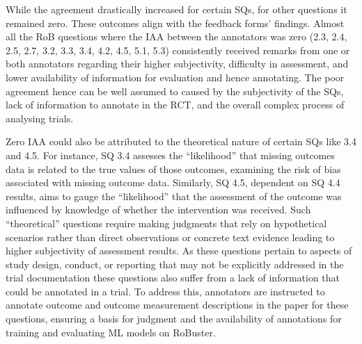 \documentclass[sn-mathphys,Numbered]{sn-jnl}%
\theoremstyle{thmstyleone}%
\theoremstyle{thmstyletwo}%
\theoremstyle{thmstylethree}%
\begin{document}
While the agreement drastically increased for certain SQs, for other questions it remained zero.
These outcomes align with the feedback forms' findings.
Almost all the RoB questions where the IAA between the annotators was zero (2.3, 2.4, 2.5, 2.7, 3.2, 3.3, 3.4, 4.2, 4.5, 5.1, 5.3) consistently received remarks from one or both annotators regarding their higher subjectivity, difficulty in assessment, and lower availability of information for evaluation and hence annotating.
The poor agreement hence can be well assumed to caused by the subjectivity of the SQs, lack of information to annotate in the RCT, and the overall complex process of analysing trials.


Zero IAA could also be attributed to the theoretical nature of certain SQs like 3.4 and 4.5.
For instance, SQ 3.4 assesses the ``likelihood'' that missing outcomes data is related to the true values of those outcomes, examining the risk of bias associated with missing outcome data.
Similarly, SQ 4.5, dependent on SQ 4.4 results, aims to gauge the ``likelihood'' that the assessment of the outcome was influenced by knowledge of whether the intervention was received. 
Such ``theoretical'' questions require making judgments that rely on hypothetical scenarios rather than direct observations or concrete text evidence leading to higher subjectivity of assessment results.
As these questions pertain to aspects of study design, conduct, or reporting that may not be explicitly addressed in the trial documentation these questions also suffer from a lack of information that could be annotated in a trial.
To address this, annotators are instructed to annotate outcome and outcome measurement descriptions in the paper for these questions, ensuring a basis for judgment and the availability of annotations for training and evaluating ML models on RoBuster.
\end{document}

